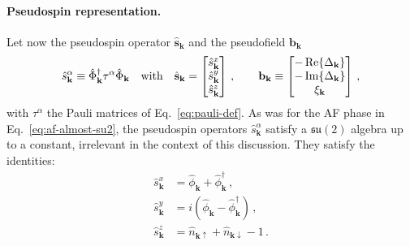 \paragraph{Pseudospin representation.}

Let now the pseudospin operator $\hat{\mathbf{s}}_\mathbf{k}$ and the pseudofield $\mathbf{b}_\mathbf{k}$
\[
\hat s_\mathbf{k}^\alpha \equiv \hat \Phi_\mathbf{k}^\dagger \tau^\alpha \hat \Phi_\mathbf{k}
\qq{with}
\hat{\mathbf{s}}_\mathbf{k} = \begin{bmatrix}
	\hat s_\mathbf{k}^x \\
	\hat s_\mathbf{k}^y \\
	\hat s_\mathbf{k}^z
\end{bmatrix} \, ,
\qquad
\mathbf{b}_\mathbf{k} \equiv \begin{bmatrix}
	- \Re \lbrace \Delta_\mathbf{k} \rbrace \\ - \Im \lbrace \Delta_\mathbf{k} \rbrace \\ \xi_\mathbf{k} 
\end{bmatrix} \, ,
\]
with $\tau^\alpha$ the Pauli matrices of Eq.~\eqref{eq:pauli-def}. As was for the AF phase in Eq.~\eqref{eq:af-almost-su2}, the pseudospin operators $\hat s_\mathbf{k}^\alpha$ satisfy a $\mathfrak{su}(2)$ algebra up to a constant, irrelevant in the context of this discussion. They satisfy the identities:
\begin{align}
	\hat s_\mathbf{k}^x &= \hat \phi_\mathbf{k} + \hat \phi_\mathbf{k}^\dagger \, , \label{eq:sc-hm-x-psi} \\
	\hat s_\mathbf{k}^y &= i \left(
	\hat \phi_\mathbf{k} - \hat \phi_\mathbf{k}^\dagger 
	\right) \, ,\label{eq:sc-hm-y-psi} \\
	\hat s_\mathbf{k}^z &= \hat n_{\mathbf{k}\uparrow} + \hat n_{\mathbf{k}\downarrow} - 1 \, . \label{eq:sc-hm-z-psi} 
\end{align}
%

